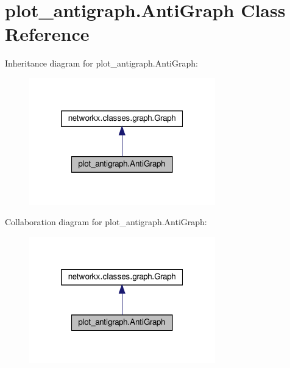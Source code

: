 \hypertarget{classplot__antigraph_1_1AntiGraph}{}\section{plot\+\_\+antigraph.\+Anti\+Graph Class Reference}
\label{classplot__antigraph_1_1AntiGraph}


Inheritance diagram for plot\+\_\+antigraph.\+Anti\+Graph\+:
\nopagebreak
\begin{figure}[H]
\begin{center}
\leavevmode
\includegraphics[width=229pt]{classplot__antigraph_1_1AntiGraph__inherit__graph}
\end{center}
\end{figure}


Collaboration diagram for plot\+\_\+antigraph.\+Anti\+Graph\+:
\nopagebreak
\begin{figure}[H]
\begin{center}
\leavevmode
\includegraphics[width=229pt]{classplot__antigraph_1_1AntiGraph__coll__graph}
\end{center}
\end{figure}
